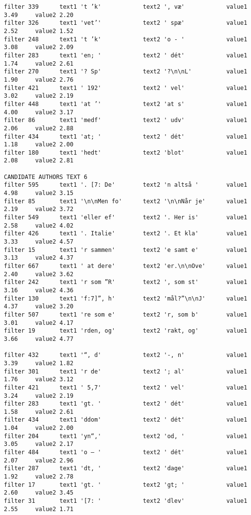 {\begin{verbatim}
filter 339      text1 't ’k'            text2 ', væ'            value1 3.49     value2 2.20
filter 326      text1 'vet’'            text2 ' spæ'            value1 2.52     value2 1.52
filter 248      text1 't ’k'            text2 'o - '            value1 3.08     value2 2.09
filter 283      text1 'en; '            text2 ' dét'            value1 1.74     value2 2.61
filter 270      text1 '? Sp'            text2 '?\n\nL'          value1 1.90     value2 2.76
filter 421      text1 ' 192'            text2 ' vel'            value1 3.02     value2 2.19
filter 448      text1 'at ’'            text2 'at s'            value1 4.00     value2 3.17
filter 86       text1 'medf'            text2 ' udv'            value1 2.06     value2 2.88
filter 434      text1 'at; '            text2 ' dét'            value1 1.18     value2 2.00
filter 180      text1 'hedt'            text2 'blot'            value1 2.08     value2 2.81

CANDIDATE AUTHORS TEXT 6
filter 595      text1 '. [7: De'        text2 'n altså '        value1 4.98     value2 3.15
filter 85       text1 '\n\nMen fo'      text2 '\n\nNår je'      value1 2.19     value2 3.72
filter 549      text1 'eller ef'        text2 '. Her is'        value1 2.58     value2 4.02
filter 426      text1 '. Italie'        text2 '. Et kla'        value1 3.33     value2 4.57
filter 15       text1 'r sammen'        text2 'e samt e'        value1 3.13     value2 4.37
filter 667      text1 ' at dere'        text2 'er.\n\nOve'      value1 2.40     value2 3.62
filter 242      text1 'r som ”R'        text2 ', som st'        value1 3.16     value2 4.36
filter 130      text1 'f:7]”, h'        text2 'mål?”\n\nJ'      value1 4.37     value2 3.20
filter 507      text1 're som e'        text2 'r, som b'        value1 3.01     value2 4.17
filter 19       text1 'rden, og'        text2 'rakt, og'        value1 3.66     value2 4.77

filter 432      text1 '“, d'            text2 '-, n'            value1 3.39     value2 1.82
filter 301      text1 'r de'            text2 '; al'            value1 1.76     value2 3.12
filter 421      text1 ' 5,7'            text2 ' vel'            value1 3.24     value2 2.19
filter 283      text1 'gt. '            text2 ' dét'            value1 1.58     value2 2.61
filter 434      text1 'ddom'            text2 ' dét'            value1 1.04     value2 2.00
filter 204      text1 'yn“,'            text2 'od, '            value1 3.05     value2 2.17
filter 484      text1 'o – '            text2 ' dét'            value1 2.07     value2 2.96
filter 287      text1 'dt, '            text2 'dage'            value1 1.92     value2 2.78
filter 17       text1 'gt. '            text2 'gt; '            value1 2.60     value2 3.45
filter 31       text1 '[7: '            text2 'dlev'            value1 2.55     value2 1.71


\end{verbatim}}
